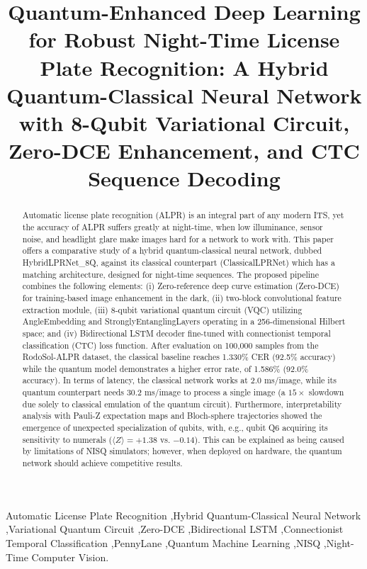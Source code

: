 \documentclass[preprint,12pt]{elsarticle}
\begin{document}
\begin{frontmatter}

\title{Quantum-Enhanced Deep Learning for Robust Night-Time License Plate Recognition: A Hybrid Quantum-Classical Neural Network with 8-Qubit Variational Circuit, Zero-DCE Enhancement, and CTC Sequence Decoding}



\begin{abstract}
Automatic license plate recognition (ALPR) is an integral part of any modern ITS, yet the accuracy of ALPR suffers greatly at night-time, when low illuminance, sensor noise, and headlight glare make images hard for a network to work with. This paper offers a comparative study of a hybrid quantum-classical neural network, dubbed HybridLPRNet\_8Q, against its classical counterpart (ClassicalLPRNet) which has a matching architecture, designed for night-time sequences. The proposed pipeline combines the following elements: (i) Zero-reference deep curve estimation (Zero-DCE) for training-based image enhancement in the dark, (ii) two-block convolutional feature extraction module, (iii) 8-qubit variational quantum circuit (VQC) utilizing AngleEmbedding and StronglyEntanglingLayers operating in a 256-dimensional Hilbert space; and (iv) Bidirectional LSTM decoder fine-tuned with connectionist temporal classification (CTC) loss function. After evaluation on 100,000 samples from the RodoSol-ALPR dataset, the classical baseline reaches 1.330\% CER (92.5\% accuracy) while the quantum model demonstrates a higher error rate, of 1.586\% (92.0\% accuracy). In terms of latency, the classical network works at 2.0 ms/image, while its quantum counterpart needs 30.2 ms/image to process a single image (a $15\times$ slowdown due solely to classical emulation of the quantum circuit). Furthermore, interpretability analysis with Pauli-Z expectation maps and Bloch-sphere trajectories showed the emergence of unexpected specialization of qubits, with, e.g., qubit Q6 acquiring its sensitivity to numerals ($\langle Z \rangle = +1.38$ vs. $-0.14$). This can be explained as being caused by limitations of NISQ simulators; however, when deployed on hardware, the quantum network should achieve competitive results.
\end{abstract}

\begin{keyword}
Automatic License Plate Recognition \sep  Hybrid Quantum-Classical Neural Network \sep  Variational Quantum Circuit \sep  Zero-DCE \sep  Bidirectional LSTM \sep  Connectionist Temporal Classification \sep  PennyLane \sep  Quantum Machine Learning \sep  NISQ \sep  Night-Time Computer Vision.
\end{keyword}

\end{frontmatter}
\end{document}
